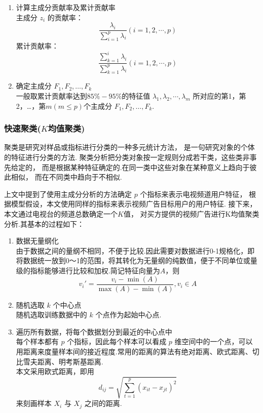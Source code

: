 \begin{enumerate}[(1)]
    \item 计算主成分贡献率及累计贡献率
    \\主成分 $z_i$ 的贡献率：
    \begin{equation}
        \frac{\lambda_i}{\sum\limits_{i=1}^{p}\lambda_i} (i=1,2,\cdots,p)
    \end{equation}
    累计贡献率：
    \begin{equation}
        \frac{\sum\limits_{k=1}^{i}\lambda_i}{\sum\limits_{k=1}^{p}\lambda_i}(i=1,2,\cdots,p)
    \end{equation}
    \item 确定主成分 $F_1,F_2,…,F_k$
    \\一般取累计贡献率达到$85\%-95\%$的特征值 $\lambda_1,\lambda_2,\cdots,\lambda_m$ 所对应的第1，第2，…，第$m(m \leq p)$个主成分 $F_1,F_2,…,F_k$.
\end{enumerate}

\subsubsection{快速聚类($K$均值聚类)}

聚类是研究对样品或指标进行分类的一种多元统计方法，
是一句研究对象的个体的特征进行分类的方法.
聚类分析把分类对象按一定规则分成若干类，这些类非事先给定的，
而是根据某种特征确定的.在同一类中这些对象在某种意义上趋向于彼此相似，
而在不同类中趋向于不相似.

上文中提到了使用主成分分析的方法确定 $p$ 个指标来表示电视频道用户特征，
根据模型假设，本文使用同样的指标来表示视频广告目标用户的用户特征.
接下来，本文通过电视台的频道总数确定一个$K$值，
对买方提供的视频广告进行K均值聚类分析.其基本的过程如下：

\begin{enumerate}[(1)]
    \item 数据无量纲化
    \\由于数据之间的量纲不相同，不便于比较.因此需要对数据进行0-1规格化，即将数据统一放到0～1的范围，将其转化为无量纲的纯数值，便于不同单位或量级的指标能够进行比较和加权.简记特征向量为$A$，则
    \begin{equation}
        v_i'=\frac{v_i-\min(A)}{\max{(A)}-\min{(A)}},v_i\in A    
    \end{equation}
    \item 随机选取 $k$ 个中心点
    \\ 随机选取训练数据中的 $k$ 个点作为起始中心点.
    \item 遍历所有数据，将每个数据划分到最近的中心点中
    \\ 每个样本都有 $p$ 个指标，因此每个样本可以看成 $p$ 维空间中的一个点，可以用距离来度量样本间的接近程度.常用的距离的算法有绝对距离、欧式距离、切比雪夫距离、明考斯基距离.
    \\本文采用欧式距离，即用
    \begin{equation}
        d_{ij}=\sqrt{\sum\limits_{t=1}^{p}(x_{it}-x_{jt})^2}    
    \end{equation}
    来刻画样本 $X_i$ 与 $X_j$ 之间的距离.
\end{enumerate}

